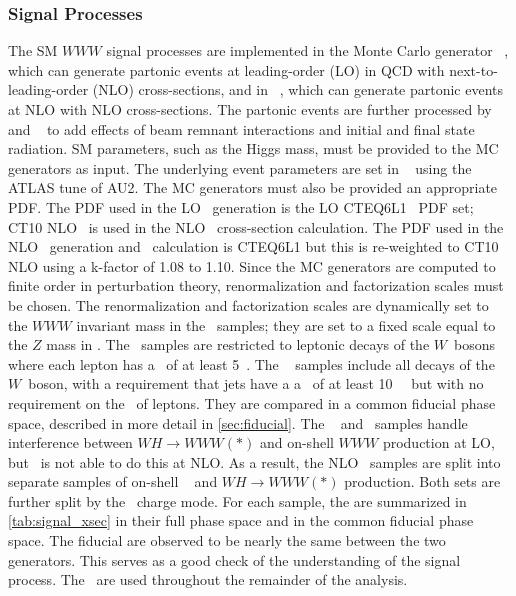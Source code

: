 \subsubsection{Signal Processes}
\label{sec:signal}



The SM $WWW$ signal processes are implemented in the Monte
Carlo generator \vbfnlo~\cite{Arnold:2011wj,Arnold:2012xn},
which can generate partonic events at leading-order (LO) in QCD with
next-to-leading-order (NLO) cross-sections, 
and in \madgraph~\cite{MadGraph}, which can generate
partonic events at NLO  with NLO cross-sections. 
The partonic events are further processed 
by \pythiaeight~\cite{Sjostrand:2007gs} and \photos~\cite{Golonka:2005pn} 
to add effects of beam remnant interactions and initial and 
final state radiation. 
SM parameters, such as the Higgs mass,
must be provided to the MC generators as input. 
The underlying event
parameters are set in \pythiaeight~ using the ATLAS tune 
of AU2\cite{atlas:2011zja}.
The MC generators must also be provided an appropriate PDF.
The PDF used  in the LO \vbfnlo~generation is
the LO CTEQ6L1~\cite{Pumplin:2002vw} PDF set;
CT10 NLO~\cite{guzzi:2011sv}
is used in the NLO \vbfnlo~cross-section calculation.
The PDF used in the NLO \madgraph~generation 
and \xsec~calculation is CTEQ6L1 
but this is re-weighted to CT10 NLO using a k-factor of 1.08 to 1.10.
Since the MC generators are computed to finite order in perturbation
theory, renormalization and factorization scales must be chosen.
The renormalization and factorization scales are dynamically
set to the $WWW$ invariant mass in the \vbfnlo~samples; they 
are set to a fixed scale equal to the $Z$ mass in \madgraph.
The \vbfnlo~samples are restricted to leptonic decays of the $W$~bosons
where each lepton has a \pt~of at least 5~\GeV. The \madgraph~
samples include all decays of the $W$~boson, with a requirement 
that jets have a a \pt~of at least 10~\GeV~ but with no requirement
on the \pt~of leptons.
They are compared in a common fiducial phase space,
described in more detail in \sec\ref{sec:fiducial}.
The \vbfnlo~ and \madgraph~samples handle interference 
between $WH\rightarrow WWW(*)$ 
and on-shell $WWW$ production at LO, but \madgraph~is not
able to do this at NLO. As a result, the NLO \madgraph~samples
are split into separate samples of 
on-shell \www~ and $WH\rightarrow WWW(*)$ production.
Both sets are further split by the \www~charge mode.
For each sample, the \xsecs are summarized in \tab\ref{tab:signal_xsec} 
in their full phase space and in the common fiducial phase space.
The fiducial \xsecs are observed to be nearly the same
between the two generators.
This serves as a good check of the understanding of the 
signal process. The \madgraph~\xsecs are used throughout the 
remainder of the analysis.


